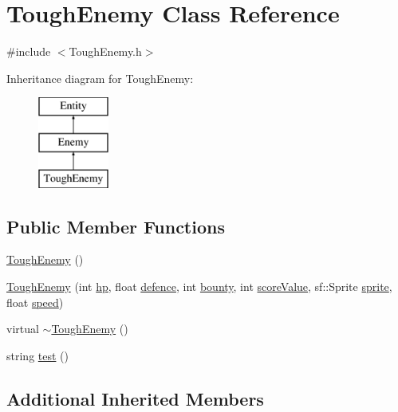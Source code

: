 \hypertarget{class_tough_enemy}{\section{Tough\+Enemy Class Reference}
\label{class_tough_enemy}
}


{\ttfamily \#include $<$Tough\+Enemy.\+h$>$}

Inheritance diagram for Tough\+Enemy\+:\begin{figure}[H]
\begin{center}
\leavevmode
\includegraphics[height=3.000000cm]{class_tough_enemy}
\end{center}
\end{figure}
\subsection*{Public Member Functions}
\begin{DoxyCompactItemize}
\item 
\hyperlink{class_tough_enemy_aceaf7ef1a1ec0d4eda307b0b9b2d89da}{Tough\+Enemy} ()
\item 
\hyperlink{class_tough_enemy_a2de3dde139f0a1f11e3e1bf0540d11d9}{Tough\+Enemy} (int \hyperlink{class_enemy_a278d70100af07c946743db1b7a1a9f59}{hp}, float \hyperlink{class_enemy_a9bb5d74024760e604c41ba79cc7da892}{defence}, int \hyperlink{class_enemy_a1d9a86d110b87f3cc55b40d1bdb59eb5}{bounty}, int \hyperlink{class_enemy_abc49d5a2cef917c8ece8a16547f8efee}{score\+Value}, sf\+::\+Sprite \hyperlink{class_entity_a48ef4ab143b8d0211877c9f6be42e824}{sprite}, float \hyperlink{class_entity_a1de3d8d9ab8088f61e6726069b26fa60}{speed})
\item 
virtual \hyperlink{class_tough_enemy_ae99335f00c32922c352c476c764f99d1}{$\sim$\+Tough\+Enemy} ()
\item 
string \hyperlink{class_tough_enemy_aec2e1a119c04896b1bd5aa7b36e2acca}{test} ()
\end{DoxyCompactItemize}
\subsection*{Additional Inherited Members}


